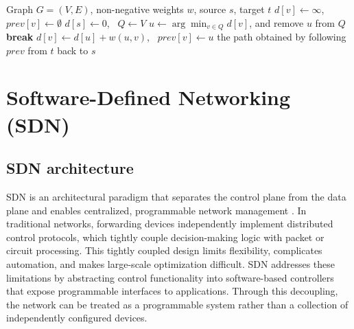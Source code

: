 \begin{algorithm}[ht]
    \caption{Dijkstra's shortest-path algorithm}
    \label{alg:ch2-dijkstra}
    \begin{algorithmic}[1]
        \Require Graph $G=(V,E)$, non-negative weights $w$, source $s$, target $t$
        \State $d[v] \gets \infty$, \ $\mathit{prev}[v] \gets \emptyset$
        \EndFor
        \State $d[s] \gets 0$, \ $Q \gets V$ 
        \State $u \gets \arg\min_{v \in Q} d[v]$, and remove $u$ from $Q$
        \State \textbf{break}
        \EndIf
        \State $d[v] \gets d[u] + w(u,v)$, \ $\mathit{prev}[v] \gets u$
        \EndIf
        \EndFor
        \EndWhile
        \State \Return the path obtained by following $\mathit{prev}$ from $t$ back to $s$
    \end{algorithmic}
\end{algorithm}

\section{Software-Defined Networking (SDN)}\label{sec:sdn}
\subsection{SDN architecture}\label{sub:sdn_arch}
SDN is an architectural paradigm that separates the control plane from the data plane and enables centralized, programmable network management \cite{kreutz2014software}.
In traditional networks, forwarding devices independently implement distributed control protocols, which tightly couple decision-making logic with packet or circuit processing.
This tightly coupled design limits flexibility, complicates automation, and makes large-scale optimization difficult.
SDN addresses these limitations by abstracting control functionality into software-based controllers that expose programmable interfaces to applications.
Through this decoupling, the network can be treated as a programmable system rather than a collection of independently configured devices.

